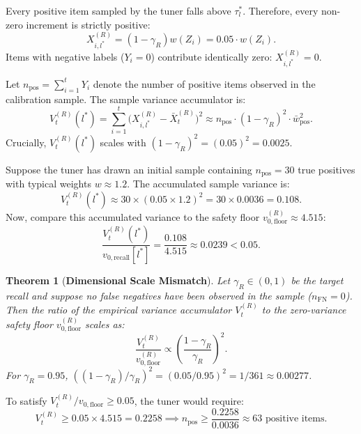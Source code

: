 \documentclass[11pt,a4paper]{article}
\newtheorem{theorem}{Theorem}
\begin{document}
Every positive item sampled by the tuner falls above $\tau_l^*$. Therefore, every non-zero increment is strictly positive:
\begin{equation}
X_{i, l^*}^{(R)} = (1 - \gamma_R) w(Z_i) = 0.05 \cdot w(Z_i).
\end{equation}
Items with negative labels ($Y_i = 0$) contribute identically zero: $X_{i, l^*}^{(R)} = 0$.

Let $n_{\text{pos}} = \sum_{i=1}^t Y_i$ denote the number of positive items observed in the calibration sample. The sample variance accumulator is:
\begin{equation}\label{eq:vt_scaling}
V_t^{(R)}(l^*) = \sum_{i=1}^t \big(X_{i, l^*}^{(R)} - \bar{X}_t^{(R)}\big)^2 \approx n_{\text{pos}} \cdot (1 - \gamma_R)^2 \cdot \bar{w}_{\text{pos}}^2.
\end{equation}
Crucially, $V_t^{(R)}(l^*)$ scales with \textbf{$(1 - \gamma_R)^2 = (0.05)^2 = 0.0025$}.

Suppose the tuner has drawn an initial sample containing $n_{\text{pos}} = 30$ true positives with typical weights $w \approx 1.2$. The accumulated sample variance is:
\begin{equation}
V_t^{(R)}(l^*) \approx 30 \times (0.05 \times 1.2)^2 = 30 \times 0.0036 = 0.108.
\end{equation}
Now, compare this accumulated variance to the safety floor $v_{0, \text{floor}}^{(R)} \approx 4.515$:
\begin{equation}
\frac{V_t^{(R)}(l^*)}{v_{0, \text{recall}}[l^*]} = \frac{0.108}{4.515} \approx 0.0239 < 0.05.
\end{equation}

\begin{theorem}[\textbf{Dimensional Scale Mismatch}]\label{thm:mismatch}
Let $\gamma_R \in (0, 1)$ be the target recall and suppose no false negatives have been observed in the sample ($n_{\text{FN}} = 0$). Then the ratio of the empirical variance accumulator $V_t^{(R)}$ to the zero-variance safety floor $v_{0, \text{floor}}^{(R)}$ scales as:
\begin{equation}
\frac{V_t^{(R)}}{v_{0, \text{floor}}^{(R)}} \propto \left( \frac{1 - \gamma_R}{\gamma_R} \right)^2.
\end{equation}
For $\gamma_R = 0.95$, $((1 - \gamma_R)/\gamma_R)^2 = (0.05 / 0.95)^2 = 1 / 361 \approx 0.00277$.
\end{theorem}

To satisfy $V_t^{(R)} / v_{0, \text{floor}} \ge 0.05$, the tuner would require:
\begin{equation}
V_t^{(R)} \ge 0.05 \times 4.515 = 0.2258 \implies n_{\text{pos}} \ge \frac{0.2258}{0.0036} \approx 63 \text{ positive items}.
\end{equation}
\end{document}
